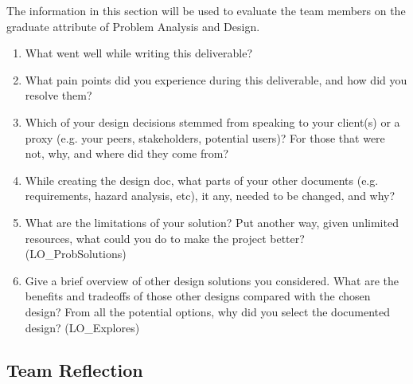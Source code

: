 \documentclass[12pt, titlepage]{article}
\begin{document}
The information in this section will be used to evaluate the team members on the
graduate attribute of Problem Analysis and Design.



\begin{enumerate}
  \item What went well while writing this deliverable? 
  \item What pain points did you experience during this deliverable, and how
    did you resolve them?
  \item Which of your design decisions stemmed from speaking to your client(s)
  or a proxy (e.g. your peers, stakeholders, potential users)? For those that
  were not, why, and where did they come from?
  \item While creating the design doc, what parts of your other documents (e.g.
  requirements, hazard analysis, etc), it any, needed to be changed, and why?
  \item What are the limitations of your solution?  Put another way, given
  unlimited resources, what could you do to make the project better? (LO\_ProbSolutions)
  \item Give a brief overview of other design solutions you considered.  What
  are the benefits and tradeoffs of those other designs compared with the chosen
  design?  From all the potential options, why did you select the documented design?
  (LO\_Explores)
\end{enumerate}

\subsection*{Team Reflection}
\end{document}
